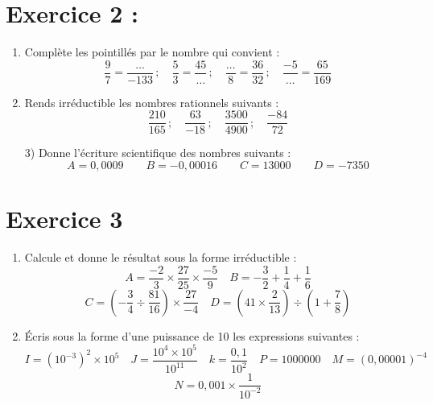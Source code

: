 \documentclass{article}
\begin{document}
\section*{Exercice 2 :}

\begin{enumerate}
    \item Complète les pointillés par le nombre qui convient :
    \[
    \frac{9}{7} = \frac{\dots}{-133} \, ; \quad \frac{5}{3} = \frac{45}{\dots} \, ; \quad \frac{\dots}{8} = \frac{36}{32} \, ; \quad \frac{-5}{\dots} = \frac{65}{169}
    \]
    
    \item Rends irréductible les nombres rationnels suivants :
    \[
    \frac{210}{165} \, ; \quad \frac{63}{-18} \, ; \quad \frac{3500}{4900} \, ; \quad \frac{-84}{72}
    \]
        \item[3)] Donne l'écriture scientifique des nombres suivants :
    \[
    A = 0,0009 \quad \quad B = -0,00016 \quad \quad C = 13000 \quad \quad D = -7350
    \]
\end{enumerate}

\section*{Exercice 3}

\begin{enumerate}
    \item Calcule et donne le résultat sous la forme irréductible :
    \[
    A = \frac{-2}{3} \times \frac{27}{25} \times \frac{-5}{9} \quad
    B = -\frac{3}{2} + \frac{1}{4} + \frac{1}{6}
    \]
    \[
    C = \left( -\frac{3}{4} \div \frac{81}{16} \right) \times \frac{27}{-4} \quad
    D = \left( 41 \times \frac{2}{13} \right) \div \left( 1 + \frac{7}{8} \right)
    \]

    \item Écris sous la forme d’une puissance de 10 les expressions suivantes :
    \[
    I = (10^{-3})^2 \times 10^5 \quad
    J = \frac{10^4 \times 10^5}{10^{11}} \quad
    k = \frac{0,1}{10^2} \quad
    P = 1000000 \quad
    M = (0,00001)^{-4}
    \]
    \[
    N = 0,001 \times \frac{1}{10^{-2}}
    \]
\end{enumerate}
\end{document}
